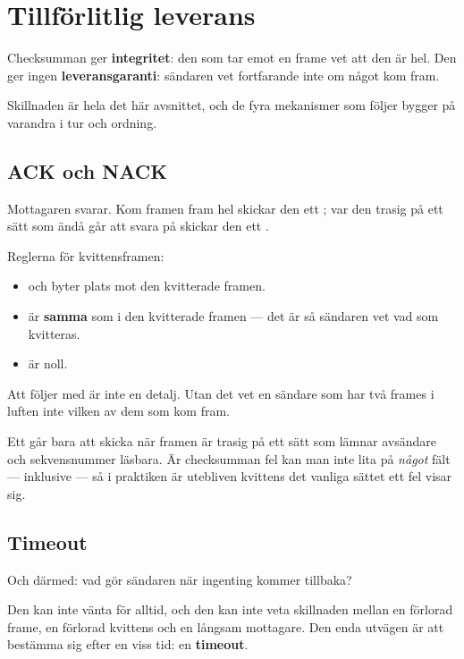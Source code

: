 \section{Tillförlitlig leverans}
\label{sec:reliability}

Checksumman ger \textbf{integritet}: den som tar emot en frame vet att den är hel. Den ger ingen
\textbf{leveransgaranti}: sändaren vet fortfarande inte om något kom fram.

Skillnaden är hela det här avsnittet, och de fyra mekanismer som följer bygger på varandra i tur
och ordning.

\subsection{ACK och NACK}

Mottagaren svarar. Kom framen fram hel skickar den ett ; var den trasig på ett sätt som
ändå går att svara på skickar den ett .

Reglerna för kvittensframen:

\begin{itemize}
  \item {} och  byter plats mot den kvitterade framen.
  \item {} är \textbf{samma} som i den kvitterade framen --- det är så sändaren vet vad
    som kvitteras.
  \item {} är noll.
\end{itemize}

Att  följer med är inte en detalj. Utan det vet en sändare som har två frames i luften
inte vilken av dem som kom fram.

\begin{aside}
\note Ett  går bara att skicka när framen är trasig på ett sätt som lämnar avsändare
och sekvensnummer läsbara. Är checksumman fel kan man inte lita på \emph{något} fält --- inklusive
 --- så i praktiken är utebliven kvittens det vanliga sättet ett fel visar sig.
\end{aside}

\subsection{Timeout}

Och därmed: vad gör sändaren när ingenting kommer tillbaka?

Den kan inte vänta för alltid, och den kan inte veta skillnaden mellan en förlorad frame, en
förlorad kvittens och en långsam mottagare. Den enda utvägen är att bestämma sig efter en viss
tid: en \textbf{timeout}.

